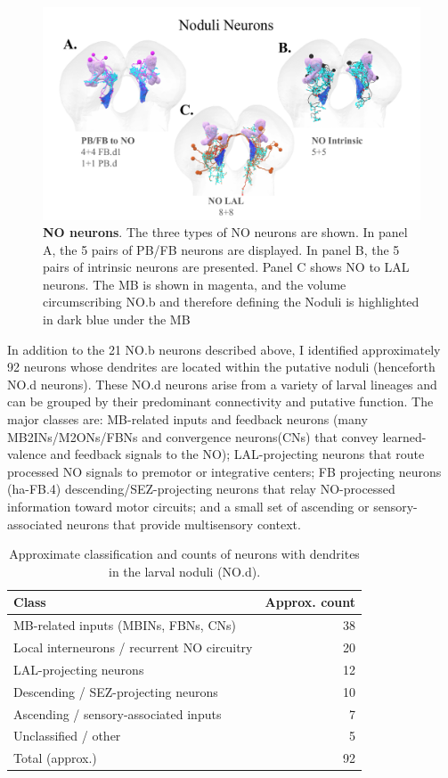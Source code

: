     \begin{figure}
        \centering
        \includegraphics[width=14cm]{Figs/CX/NOneurons.pdf}
        \caption[Noduli Neurons]{\textbf{NO neurons}. The three types of NO neurons are shown. In panel A, the 5 pairs of PB/FB neurons are displayed. In panel B, the 5 pairs of intrinsic neurons are presented. Panel C shows NO to LAL neurons. The MB is shown in magenta, and the volume circumscribing NO.b and therefore defining the Noduli is highlighted in dark blue under the MB}
        \label{NOneurons}
    \end{figure}

    In addition to the 21 NO.b neurons described above, I identified approximately 92 neurons whose dendrites are located within the putative noduli (henceforth NO.d neurons). These NO.d neurons arise from a variety of larval lineages and can be grouped by their predominant connectivity and putative function. The major classes are: MB-related inputs and feedback neurons (many MB2INs/M2ONs/FBNs and convergence neurons(CNs) that convey learned-valence and feedback signals to the NO); LAL-projecting neurons that route processed NO signals to premotor or integrative centers; FB projecting neurons (ha-FB.4) descending/SEZ-projecting neurons that relay NO-processed information toward motor circuits; and a small set of ascending or sensory-associated neurons that provide multisensory context.

    \begin{table}[H]
    \centering
    \begin{tabular}{l r}
    \toprule
    Class & Approx. count \\
    \midrule
    MB-related inputs (MBINs, FBNs, CNs) & 38 \\
    Local interneurons / recurrent NO circuitry & 20 \\
    LAL-projecting neurons & 12 \\
    Descending / SEZ-projecting neurons & 10 \\
    Ascending / sensory-associated inputs & 7 \\
    Unclassified / other & 5 \\
    \midrule
    Total (approx.) & 92 \\
    \bottomrule
    \end{tabular}
    \caption[Summary of NO.d neurons]{Approximate classification and counts of neurons with dendrites in the larval noduli (NO.d).}
    \label{NOd_summary}
    \end{table}

